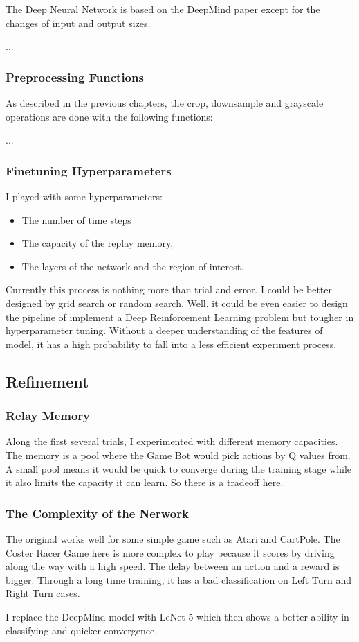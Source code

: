 The Deep Neural Network is based on the DeepMind paper except for the changes of input and output sizes.

...

\subsubsection{Preprocessing Functions}

As described in the previous chapters, the crop, downsample and grayscale operations are done with the following functions:

...

\subsubsection{Finetuning Hyperparameters}

I played with some hyperparameters:

\begin{itemize}
\item The number of time steps
\item The capacity of the replay memory,
\item The layers of the network and the region of interest.
\end{itemize}
Currently this process is nothing more than trial and error. I could be better designed by grid search or random search. Well, it could be even easier to design the pipeline of implement a Deep Reinforcement Learning problem but tougher in hyperparameter tuning. Without a deeper understanding of the features of model, it has a high probability to fall into a less efficient experiment process. 

\subsection{Refinement}

\subsubsection{Relay Memory}
Along the first several trials, I experimented with different memory capacities. The memory is a pool where the Game Bot would pick actions by Q values from. A small pool means it would be quick to converge during the training stage while it also limits the capacity it can learn. So there is a tradeoff here.

\subsubsection{The Complexity of the Nerwork}
The original works well for some simple game such as Atari and CartPole. The Coster Racer Game here is more complex to play because it scores by driving along the way with a high speed. The delay between an action and a reward is bigger. Through a long time training, it has a bad classification on Left Turn and Right Turn cases.

I replace the DeepMind model with LeNet-5 which then shows a better ability in classifying and quicker convergence.



%
%

